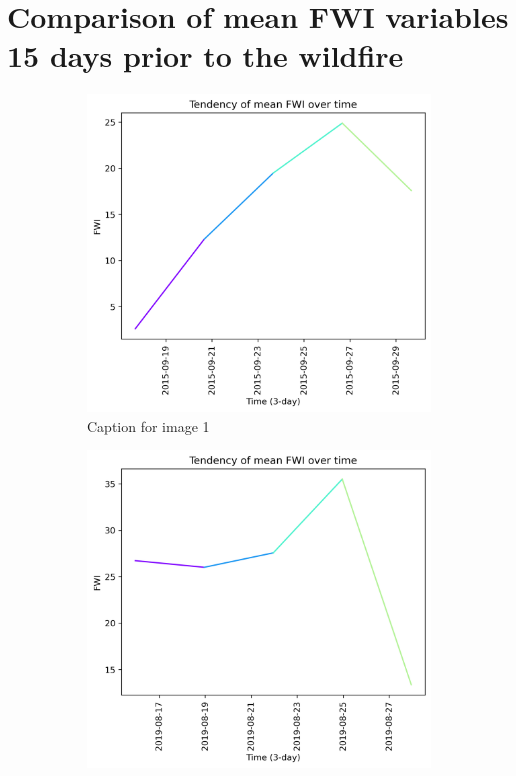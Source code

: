 \FloatBarrier

\section{Comparison of mean FWI variables 15 days prior to the wildfire}

\begin{figure}[h]
    \centering
    \caption{Caption for the whole figure}
    \begin{subfigure}{0.3\textwidth}
        \centering
        \includegraphics[width=\textwidth]{graphs/2015/15daysprior/2015_15daysprior_tendency_graph_FWI.png}
        \caption{Caption for image 1}
        \label{fig:img1}
    \end{subfigure}
    \hfill
    \begin{subfigure}{0.3\textwidth}
        \centering
        \includegraphics[width=\textwidth]{graphs/2019/15daysprior/2019_15daysprior_tendency_graph_FWI.png}

\end{subfigure}
\end{figure}
